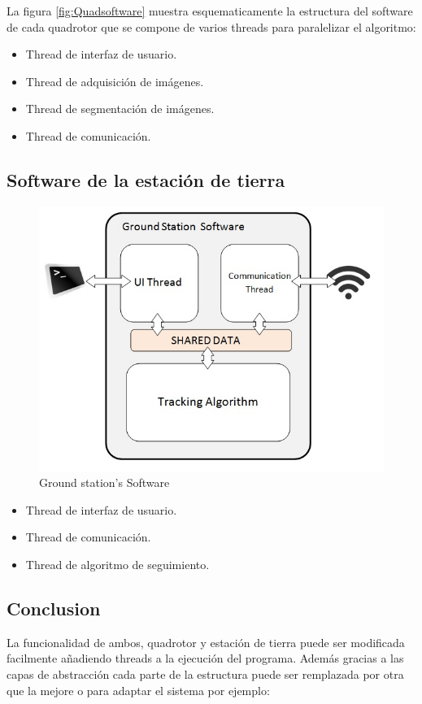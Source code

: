 	La figura \ref{fig:Quadsoftware} muestra esquematicamente la estructura del software de cada quadrotor que se compone de varios threads para paralelizar el algoritmo:
	
	
	\begin{itemize}
		\label{itemize:quadappthreads}
		\item Thread de interfaz de usuario.
		\item Thread de adquisici\'on de im\'agenes.
		\item Thread de segmentaci\'on de im\'agenes.
		\item Thread de comunicaci\'on.
	\end{itemize}
	
\subsection{Software de la estaci\'on de tierra}
	\begin{figure}[th]
		\begin{center}
			\includegraphics[width=0.7\linewidth]{../Images/c2/GroundStationsoftware}
		\end{center}
		\caption{Ground station's Software}
		\label{fig:GroundStation}
	\end{figure}

	\begin{itemize}
		\item Thread de interfaz de usuario.
		\item Thread de comunicaci\'on.
		\item Thread de algoritmo de seguimiento.
	\end{itemize}

	
\subsection{Conclusion}
La funcionalidad de ambos, quadrotor y estaci\'on de tierra puede ser modificada facilmente añadiendo threads a la ejecuci\'on del programa. Adem\'as gracias a las capas de abstracci\'on cada parte de la estructura puede ser remplazada por otra que la mejore o para adaptar el sistema por ejemplo:

